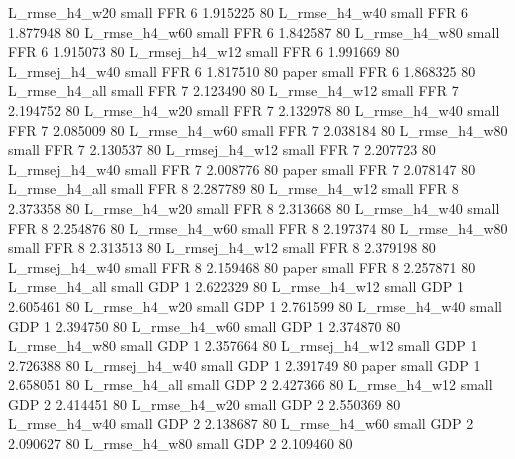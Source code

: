  L_rmse_h4_w20      small      FFR                 6 1.915225 80
 L_rmse_h4_w40      small      FFR                 6 1.877948 80
 L_rmse_h4_w60      small      FFR                 6 1.842587 80
 L_rmse_h4_w80      small      FFR                 6 1.915073 80
L_rmsej_h4_w12      small      FFR                 6 1.991669 80
L_rmsej_h4_w40      small      FFR                 6 1.817510 80
         paper      small      FFR                 6 1.868325 80
 L_rmse_h4_all      small      FFR                 7 2.123490 80
 L_rmse_h4_w12      small      FFR                 7 2.194752 80
 L_rmse_h4_w20      small      FFR                 7 2.132978 80
 L_rmse_h4_w40      small      FFR                 7 2.085009 80
 L_rmse_h4_w60      small      FFR                 7 2.038184 80
 L_rmse_h4_w80      small      FFR                 7 2.130537 80
L_rmsej_h4_w12      small      FFR                 7 2.207723 80
L_rmsej_h4_w40      small      FFR                 7 2.008776 80
         paper      small      FFR                 7 2.078147 80
 L_rmse_h4_all      small      FFR                 8 2.287789 80
 L_rmse_h4_w12      small      FFR                 8 2.373358 80
 L_rmse_h4_w20      small      FFR                 8 2.313668 80
 L_rmse_h4_w40      small      FFR                 8 2.254876 80
 L_rmse_h4_w60      small      FFR                 8 2.197374 80
 L_rmse_h4_w80      small      FFR                 8 2.313513 80
L_rmsej_h4_w12      small      FFR                 8 2.379198 80
L_rmsej_h4_w40      small      FFR                 8 2.159468 80
         paper      small      FFR                 8 2.257871 80
 L_rmse_h4_all      small      GDP                 1 2.622329 80
 L_rmse_h4_w12      small      GDP                 1 2.605461 80
 L_rmse_h4_w20      small      GDP                 1 2.761599 80
 L_rmse_h4_w40      small      GDP                 1 2.394750 80
 L_rmse_h4_w60      small      GDP                 1 2.374870 80
 L_rmse_h4_w80      small      GDP                 1 2.357664 80
L_rmsej_h4_w12      small      GDP                 1 2.726388 80
L_rmsej_h4_w40      small      GDP                 1 2.391749 80
         paper      small      GDP                 1 2.658051 80
 L_rmse_h4_all      small      GDP                 2 2.427366 80
 L_rmse_h4_w12      small      GDP                 2 2.414451 80
 L_rmse_h4_w20      small      GDP                 2 2.550369 80
 L_rmse_h4_w40      small      GDP                 2 2.138687 80
 L_rmse_h4_w60      small      GDP                 2 2.090627 80
 L_rmse_h4_w80      small      GDP                 2 2.109460 80
